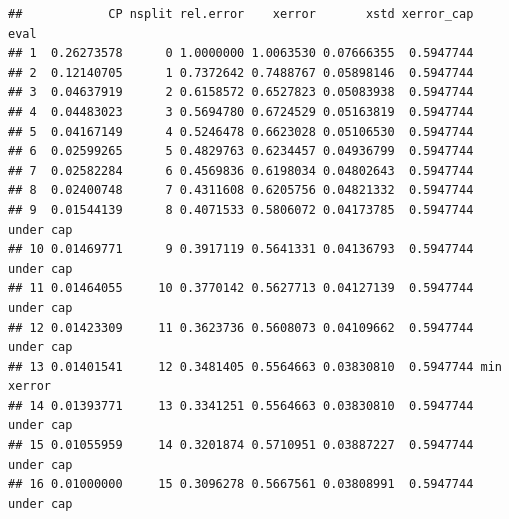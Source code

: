 \documentclass[]{book}
\newenvironment{Shaded}{\begin{snugshade}}{\end{snugshade}}
\newcommand{\DataTypeTok}[1]{\textcolor[rgb]{0.13,0.29,0.53}{#1}}
\newcommand{\DecValTok}[1]{\textcolor[rgb]{0.00,0.00,0.81}{#1}}
\newcommand{\KeywordTok}[1]{\textcolor[rgb]{0.13,0.29,0.53}{\textbf{#1}}}
\newcommand{\NormalTok}[1]{#1}
\newcommand{\OperatorTok}[1]{\textcolor[rgb]{0.81,0.36,0.00}{\textbf{#1}}}
\newcommand{\OtherTok}[1]{\textcolor[rgb]{0.56,0.35,0.01}{#1}}
\newcommand{\StringTok}[1]{\textcolor[rgb]{0.31,0.60,0.02}{#1}}
\begin{document}
\begin{Shaded}
\end{Shaded}

\begin{verbatim}
##            CP nsplit rel.error    xerror       xstd xerror_cap       eval
## 1  0.26273578      0 1.0000000 1.0063530 0.07666355  0.5947744           
## 2  0.12140705      1 0.7372642 0.7488767 0.05898146  0.5947744           
## 3  0.04637919      2 0.6158572 0.6527823 0.05083938  0.5947744           
## 4  0.04483023      3 0.5694780 0.6724529 0.05163819  0.5947744           
## 5  0.04167149      4 0.5246478 0.6623028 0.05106530  0.5947744           
## 6  0.02599265      5 0.4829763 0.6234457 0.04936799  0.5947744           
## 7  0.02582284      6 0.4569836 0.6198034 0.04802643  0.5947744           
## 8  0.02400748      7 0.4311608 0.6205756 0.04821332  0.5947744           
## 9  0.01544139      8 0.4071533 0.5806072 0.04173785  0.5947744  under cap
## 10 0.01469771      9 0.3917119 0.5641331 0.04136793  0.5947744  under cap
## 11 0.01464055     10 0.3770142 0.5627713 0.04127139  0.5947744  under cap
## 12 0.01423309     11 0.3623736 0.5608073 0.04109662  0.5947744  under cap
## 13 0.01401541     12 0.3481405 0.5564663 0.03830810  0.5947744 min xerror
## 14 0.01393771     13 0.3341251 0.5564663 0.03830810  0.5947744  under cap
## 15 0.01055959     14 0.3201874 0.5710951 0.03887227  0.5947744  under cap
## 16 0.01000000     15 0.3096278 0.5667561 0.03808991  0.5947744  under cap
\end{verbatim}
\end{document}
